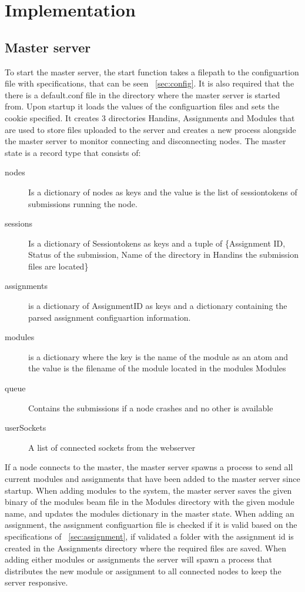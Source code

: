 \section{Implementation}
\subsection{Master server}
To start the master server, the start function takes a filepath to the configuartion file with specifications, that can be seen ~\ref{sec:config}. It is also required that the there is a default.conf file in the directory where the master server is started from. Upon startup it loads the values of the configuartion files and sets the cookie specified. It creates 3 directories Handins, Assignments and Modules that are used to store files uploaded to the server and creates a new process alongside the master server to monitor connecting and disconnecting nodes. The master state is a record type that consists of:
\begin{description}
    \item[nodes] Is a dictionary of nodes as keys and the value is the list of sessiontokens of submissions running the node.
\item [sessions] Is a dictionary of Sessiontokens as keys and a tuple of \{Assignment ID, Status of the submission, Name of the directory in Handins the submission files are located\}
\item [assignments]  is a dictionary of AssignmentID as keys and a dictionary containing the parsed assignment configuartion information.
\item [modules]  is a dictionary where the key is the name of the module as an atom and the value is the filename of the module located in the modules Modules
\item [queue] Contains the submissions if a node crashes and no other is available
\item [userSockets] A list of connected sockets from the webserver
\end{description}
If a node connects to the master, the master server spawns a process to send all current modules and assignments that have been added to the master server since startup. When adding modules to the system, the master server saves the given binary of the modules beam file in the Modules directory with the given module name, and updates the modules dictionary in the master state. When adding an assignment, the assignment configuartion file is checked if it is valid based on the specifications of ~\ref{sec:assignment}, if validated a folder with the assignment id is created in the Assignments directory where the required files are saved. When adding either modules or assignments the server will spawn a process that distributes the new module or assignment to all connected nodes to keep the server responsive.

